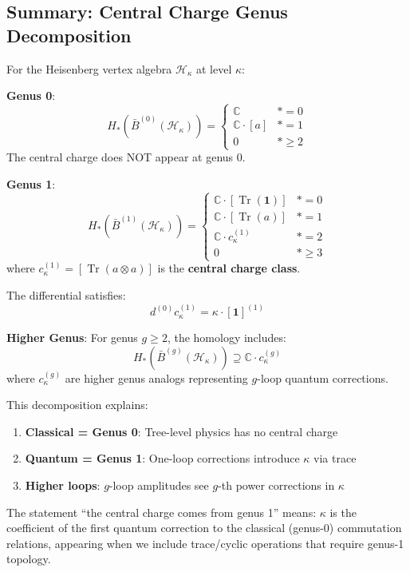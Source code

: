 \subsection{Summary: Central Charge Genus Decomposition}

\begin{theorem}
For the Heisenberg vertex algebra $\mathcal{H}_\kappa$ at level $\kappa$:

\textbf{Genus 0}: 
\begin{equation}
H_*(\bar{B}^{(0)}(\mathcal{H}_\kappa)) = \begin{cases}
\mathbb{C} & * = 0 \\
\mathbb{C} \cdot [a] & * = 1\\
0 & * \geq 2
\end{cases}
\end{equation}
The central charge does NOT appear at genus 0.

\textbf{Genus 1}:
\begin{equation}
H_*(\bar{B}^{(1)}(\mathcal{H}_\kappa)) = \begin{cases}
\mathbb{C} \cdot [\operatorname{Tr}(\mathbf{1})] & * = 0\\
\mathbb{C} \cdot [\operatorname{Tr}(a)] & * = 1\\
\mathbb{C} \cdot c_\kappa^{(1)} & * = 2\\
0 & * \geq 3
\end{cases}
\end{equation}
where $c_\kappa^{(1)} = [\operatorname{Tr}(a \otimes a)]$ is the \textbf{central charge class}.

The differential satisfies:
\begin{equation}
d^{(0)} c_\kappa^{(1)} = \kappa \cdot [\mathbf{1}]^{(1)}
\end{equation}

\textbf{Higher Genus}: For genus $g \geq 2$, the homology includes:
\begin{equation}
H_*(\bar{B}^{(g)}(\mathcal{H}_\kappa)) \supseteq \mathbb{C} \cdot c_\kappa^{(g)}
\end{equation}
where $c_\kappa^{(g)}$ are higher genus analogs representing $g$-loop quantum corrections.
\end{theorem}

\begin{remark}
This decomposition explains:
\begin{enumerate}
\item \textbf{Classical = Genus 0}: Tree-level physics has no central charge
\item \textbf{Quantum = Genus 1}: One-loop corrections introduce $\kappa$ via trace
\item \textbf{Higher loops}: $g$-loop amplitudes see $g$-th power corrections in $\kappa$
\end{enumerate}

The statement ``the central charge comes from genus 1'' means: $\kappa$ is the coefficient of the first quantum correction to the classical (genus-0) commutation relations, appearing when we include trace/cyclic operations that require genus-1 topology.
\end{remark}

